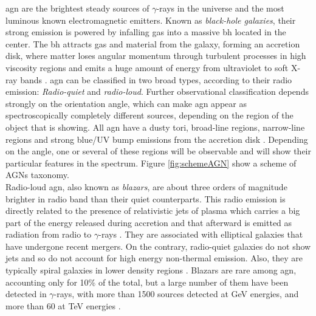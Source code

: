 \documentclass[main.tex]{subfiles}
\begin{document}
\gls{agn} are the brightest steady sources of $\gamma$-rays in the universe and the most luminous known electromagnetic emitters. Known as \textit{black-hole galaxies}, their strong emission is powered by infalling gas into a massive \gls{bh} located in the center. The \gls{bh} attracts gas and material from the galaxy, forming an accretion disk, where matter loses angular momentum through turbulent processes in high viscosity regions and emits a huge amount of energy from ultraviolet to soft X-ray bands \cite{1995AGN}. \gls{agn} can be classified in two broad types, according to their radio emission: \textit{Radio-quiet} and \textit{radio-loud}. Further observational classification depends strongly on the orientation angle, which can make \gls{agn} appear as spectroscopically completely different sources, depending on the region of the object that is showing. All \gls{agn} have a dusty tori, broad-line regions, narrow-line regions and strong blue/UV bump emissions from the accretion disk \cite{2016AGNsingammarays}. Depending on the angle, one or several of these regions will be observable and will show their particular features in the spectrum. Figure \ref{fig:schemeAGN} show a scheme of AGNs taxonomy.\\
Radio-loud \gls{agn}, also known as \textit{blazars}, are about three orders of magnitude brighter in radio band than their quiet counterparts. This radio emission is directly related to the presence of relativistic jets of plasma which carries a big part of the energy released during accretion and that afterward is emitted as radiation from radio to $\gamma$-rays \cite{2016AGNgammarayobss}. They are associated with elliptical galaxies that have undergone recent mergers.
On the contrary, radio-quiet galaxies do not show jets and so do not account for high energy non-thermal emission. Also, they are typically spiral galaxies in lower density regions \cite{1995AGNradioloudradioquiet}.
Blazars are rare among \gls{agn}, accounting only for 10\% of the total, but a large number of them have been detected in $\gamma$-rays, with more than 1500 sources detected at GeV energies, and more than 60 at TeV energies \cite{2016AGNsingammarays}.
\end{document}
